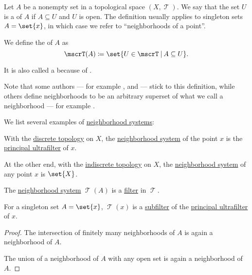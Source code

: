 \begin{definition}\label{def:neighborhood_system}
  Let \( A \) be a nonempty set in a topological space \( (X, \mscrT) \). We say that the set \( U \) is a  of \( A \) if \( A \subseteq U \) and \( U \) is open. The definition usually applies to singleton sets \( A = \set{ x } \), in which case we refer to \enquote{neighborhoods of a point}.

  We define the  of \( A \) as
  \begin{equation*}
    \mscrT(A) \coloneqq \set{ U \in \mscrT \given A \subseteq U }.
  \end{equation*}

  It is also called a  because of .

  Note that some authors --- for example \cite[12]{Engelking1989}, \cite[7]{Rudin1991Functional} and \cite[def. 10.2]{ИвановТужилин2017} --- stick to this definition, while others define neighborhoods to be an arbitrary superset of what we call a neighborhood --- for example \cite[8]{Kelley1975}.
\end{definition}

\begin{example}\label{ex:def:neighborhood_system}
  We list several examples of \hyperref[def:neighborhood_system]{neighborhood systems}:
  \begin{thmenum}
     With the \hyperref[def:discrete_topology]{discrete topology} on \( X \), the \hyperref[def:neighborhood_system]{neighborhood system} of the point \( x \) is the \hyperref[ex:principal_ultrafilter]{principal ultrafilter} of \( x \).

     At the other end, with the \hyperref[def:indiscrete_topology]{indiscrete topology} on \( X \), the \hyperref[def:neighborhood_system]{neighborhood system} of any point \( x \) is \( \set{ X } \).
  \end{thmenum}
\end{example}

\begin{proposition}\label{thm:neighborhood_filter}
  The \hyperref[def:neighborhood_system]{neighborhood system} \( \mscrT(A) \) is a \hyperref[def:lattice_ideal/ideal]{filter} in \( \mscrT \).

  For a singleton set \( A = \set{ x } \), \( \mscrT(x) \) is a \hyperref[def:lattice_ideal/submodel]{subfilter} of the \hyperref[ex:principal_ultrafilter]{principal ultrafilter} of \( x \).
\end{proposition}
\begin{proof}
  The intersection of finitely many neighborhoods of \( A \) is again a neighborhood of \( A \).

  The union of a neighborhood of \( A \) with any open set is again a neighborhood of \( A \).
\end{proof}

